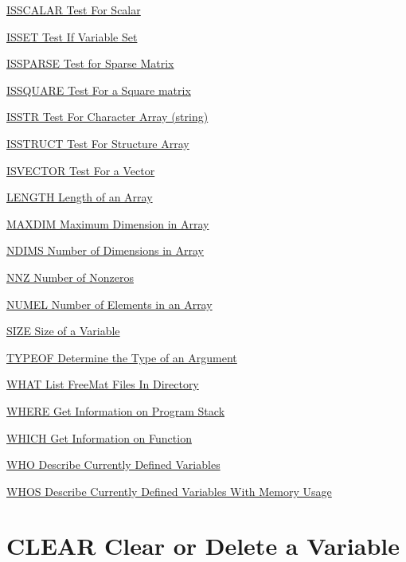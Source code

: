 \begin{DoxyItemize}
\item \hyperlink{inspection_isscalar}{I\-S\-S\-C\-A\-L\-A\-R Test For Scalar}  
\item \hyperlink{inspection_isset}{I\-S\-S\-E\-T Test If Variable Set}  
\item \hyperlink{inspection_issparse}{I\-S\-S\-P\-A\-R\-S\-E Test for Sparse Matrix}  
\item \hyperlink{inspection_issquare}{I\-S\-S\-Q\-U\-A\-R\-E Test For a Square matrix}  
\item \hyperlink{inspection_isstr}{I\-S\-S\-T\-R Test For Character Array (string)}  
\item \hyperlink{inspection_isstruct}{I\-S\-S\-T\-R\-U\-C\-T Test For Structure Array}  
\item \hyperlink{inspection_isvector}{I\-S\-V\-E\-C\-T\-O\-R Test For a Vector}  
\item \hyperlink{inspection_length}{L\-E\-N\-G\-T\-H Length of an Array}  
\item \hyperlink{inspection_maxdim}{M\-A\-X\-D\-I\-M Maximum Dimension in Array}  
\item \hyperlink{inspection_ndims}{N\-D\-I\-M\-S Number of Dimensions in Array}  
\item \hyperlink{inspection_nnz}{N\-N\-Z Number of Nonzeros}  
\item \hyperlink{inspection_numel}{N\-U\-M\-E\-L Number of Elements in an Array}  
\item \hyperlink{inspection_size}{S\-I\-Z\-E Size of a Variable}  
\item \hyperlink{inspection_typeof}{T\-Y\-P\-E\-O\-F Determine the Type of an Argument}  
\item \hyperlink{inspection_what}{W\-H\-A\-T List Free\-Mat Files In Directory}  
\item \hyperlink{inspection_where}{W\-H\-E\-R\-E Get Information on Program Stack}  
\item \hyperlink{inspection_which}{W\-H\-I\-C\-H Get Information on Function}  
\item \hyperlink{inspection_who}{W\-H\-O Describe Currently Defined Variables}  
\item \hyperlink{inspection_whos}{W\-H\-O\-S Describe Currently Defined Variables With Memory Usage}  
\end{DoxyItemize}\hypertarget{inspection_clear}{}\section{C\-L\-E\-A\-R Clear or Delete a Variable}\label{inspection_clear}
